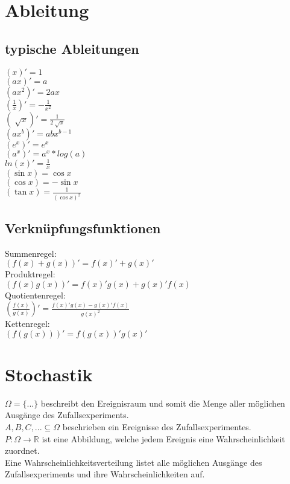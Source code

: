 \documentclass[a4paper, 10pt, landscape]{article}
\begin{document}
\begin{multicols}{5}
\begin{small}
	\section{Ableitung}
		\subsection{typische Ableitungen}
			\begin{multicols}{2}		
				$(x)' = 1$ \\
				$(ax)' = a$ \\
				$(ax^2)' = 2ax$ \\
				$(\frac{1}{x})' = -\frac{1}{x^2}$ \\
				$(\sqrt[]{x})' = \frac{1}{2\sqrt[]{x}}$ \\
				$(ax^b)' = abx^{b-1}$ \\
				$(e^x)' = e^x $ \\
				$(a^x)' = a^x*log(a) $ \\
				$ln(x)' = \frac{1}{x}$ \\
				$(\sin x) = \cos x$ \\
				$(\cos x) = -\sin x$ \\
				$(\tan x) = \frac{1}{(\cos x)^2}$ \\ 
			\end{multicols}
		\subsection{Verknüpfungsfunktionen}
			Summenregel:\\
			$(f(x) + g(x))' = f(x)' + g(x)'$  \\ 
			Produktregel:\\
			$(f(x)g(x))' = f(x)'g(x)+g(x)'f(x)$  \\
			Quotientenregel:\\
			$(\frac{f(x)}{g(x)})' = \frac{f(x)'g(x)-g(x)'f(x)}{g(x)^2}$ \\
			Kettenregel:\\
			$(f(g(x)))' = f(g(x))'g(x)'$ \\
	\section{Stochastik}
	    $\Omega = \{ ... \}$ beschreibt den Ereignisraum und somit die Menge aller möglichen Ausgänge des Zufallsexperiments.\\
    	$A, B, C, ... \subseteq \Omega$ beschrieben ein Ereignisse des Zufallsexperimentes.\\
    	$P: \Omega \rightarrow \mathbb{R}$ ist eine Abbildung, welche jedem Ereignis eine Wahrscheinlichkeit zuordnet.\\
    	Eine Wahrscheinlichkeitsverteilung listet alle möglichen Ausgänge des Zufallsexperiments und ihre Wahrscheinlichkeiten auf.

\end{small}
\end{multicols}
\end{document}
